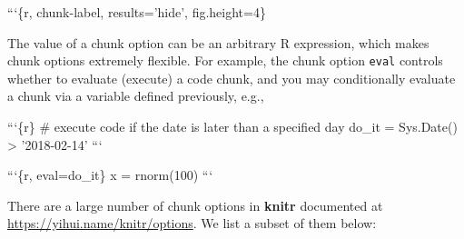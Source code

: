 \documentclass[]{article}
\newenvironment{Shaded}{\begin{snugshade}}{\end{snugshade}}
\newcommand{\FunctionTok}[1]{\textcolor[rgb]{0.00,0.00,0.00}{#1}}
\newcommand{\NormalTok}[1]{#1}
\begin{document}
\begin{Shaded}
\begin{Highlighting}[]
\NormalTok{```\{r, chunk-label, results='hide', fig.height=4\}}
\end{Highlighting}
\end{Shaded}

The value of a chunk option can be an arbitrary R expression, which
makes chunk options extremely flexible. For example, the chunk option
\texttt{eval} controls whether to evaluate (execute) a code chunk, and
you may conditionally evaluate a chunk via a variable defined
previously, e.g.,

\begin{Shaded}
\begin{Highlighting}[]
\NormalTok{```\{r\}}
\FunctionTok{# execute code if the date is later than a specified day}
\NormalTok{do_it = Sys.Date() > '2018-02-14'}
\NormalTok{```}

\NormalTok{```\{r, eval=do_it\}}
\NormalTok{x = rnorm(100)}
\NormalTok{```}
\end{Highlighting}
\end{Shaded}

There are a large number of chunk options in \textbf{knitr} documented
at \url{https://yihui.name/knitr/options}. We list a subset of them
below:
\end{document}
